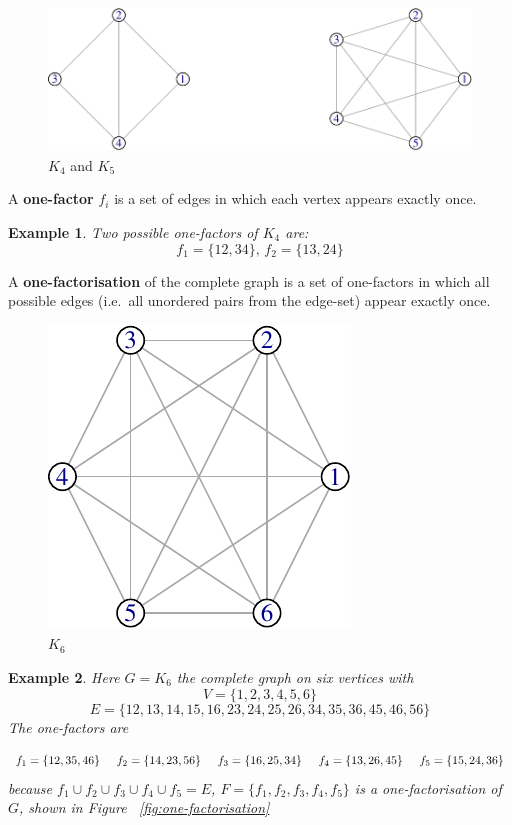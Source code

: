 \documentclass[
  12pt,
  a4paper]{book}
\newtheorem{example}{Example}
\begin{document}
\begin{figure}
\centering
\includegraphics{figure/complete-graph-1.pdf}
\caption{\(K_4\) and \(K_5\)}
\end{figure}

A \textbf{one-factor} \(f_i\) is a set of edges in which each vertex
appears exactly once.

\begin{example}
Two possible one-factors of
$K_4$
are:
$$f_1 = \{12,34\},\, f_2 = \{13,24\}$$
\end{example}

A \textbf{one-factorisation} of the complete graph is a set of
one-factors in which all possible edges (i.e.~all unordered pairs from
the edge-set) appear exactly once.

\begin{figure}
\centering
\includegraphics{figure/K6-1.pdf}
\caption{\(K_6\)}
\end{figure}

\begin{example}
Here
$G = K_6$
the complete graph on six vertices with
$$V = \{1, 2, 3, 4, 5, 6\}$$
$$E = \{12, 13, 14, 15, 16, 23, 24, 25, 26, 34, 35, 36, 45, 46, 56\}$$
The one-factors are

$$
f_1 = \{12, 35, 46\} \hspace{0.5cm}
f_2 = \{14, 23, 56\} \hspace{0.5cm}
f_3 = \{16, 25, 34\} \hspace{0.5cm}
f_4 = \{13, 26, 45\} \hspace{0.5cm} 
f_5 = \{15, 24, 36\}
$$
because
$f_1 \cup f_2 \cup f_3 \cup f_4 \cup f_5 = E$,
$F = \{f_1, f_2, f_3, f_4, f_5\}$
is a one-factorisation of
$G$,
shown in Figure ~\ref{fig:one-factorisation} 
\end{example}
\end{document}
